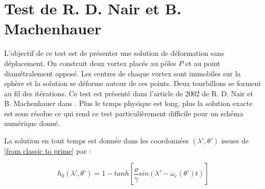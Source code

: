 



\section{Test de R. D. Nair et B. Machenhauer}

L'objectif de ce test est de présenter une solution de déformation sans déplacement. On construit deux vortex placés au pôles $P$ et au point diamétralement opposé. Les centres de chaque vortex sont immobiles sur la sphère et la solution se déforme autour de ces points. Deux tourbillons se forment au fil des itérations. Ce test est présenté dans l'article de 2002 de R. D. Nair et B. Machenhauer dans \cite{Nair2002}. 
Plus le temps physique est long, plus la solution exacte est sous résolue ce qui rend ce test particulièrement difficile pour un schéma numérique donné.

La solution en tout temps est donnée dans les coordonnées $(\lambda', \theta' )$ issues de \eqref{from classic to prime} par :

\begin{equation}
\label{exact_machenhauer}
h_0(\lambda', \theta') = 1- tanh \left[ \dfrac{\rho}{\gamma} sin \left( \lambda' - \omega_r(\theta') t \right) \right]
\end{equation}


